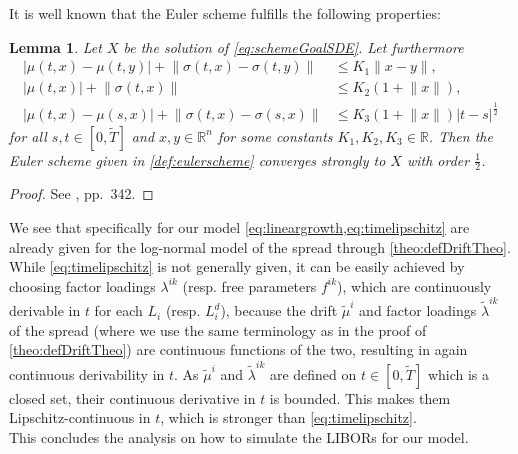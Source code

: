 \documentclass[12pt]{article}
\newtheorem{lemma}[theorem]{Lemma}
\newtheorem{remark}[theorem]{Remark}
\begin{document}
	It is well known that the Euler scheme fulfills the  following properties:
	\begin{lemma}
		Let $X$ be the solution of \cref{eq:schemeGoalSDE}. 
		Let furthermore 
		\begin{align}
			|\mu(t,x) - \mu(t,y)| + \lVert\sigma(t,x) - \sigma(t,y)\rVert &\le K_1 \lVert x - y\rVert, \label{eq:lipschitzcont}\\
			|\mu(t,x)| + \lVert\sigma(t,x)\rVert &\le K_2(1+\lVert x\rVert),\label{eq:lineargrowth}\\
			|\mu(t,x) - \mu(s,x)| + \lVert\sigma(t,x) - \sigma(s,x)\rVert &\le K_3 (1+\lVert x\rVert) |t - s|^{\frac{1}{2}}\label{eq:timelipschitz}
		\end{align}
		for all $s,t \in \left[0,\tilde{T}\right]$ and $x,y\in \mathbb{R}^n$ for some constants $K_1, K_2, K_3 \in \mathbb{R}$.
		Then the Euler scheme given in \cref{def:eulerscheme} converges strongly to $X$ with order $\frac{1}{2}$.
	\end{lemma}
	\begin{proof}
		See \cite{kloedenSchemes}, pp.\ 342.
	\end{proof}
	We see that specifically for our model \cref{eq:lineargrowth,eq:timelipschitz} are already given for the log-normal model of the spread through \cref{theo:defDriftTheo}.\\
	While \cref{eq:timelipschitz} is not generally given, it can be easily achieved by choosing factor loadings $\lambda^{i k}$ (resp. free parameters $f^{i k}$), which are continuously derivable in $t$ for each $L_i$ (resp. $L^d_i$), because the drift $\tilde{\mu}^i$ and factor loadings $\tilde{\lambda}^{i k}$ of the spread (where we use the same terminology as in the proof of \cref{theo:defDriftTheo}) are continuous functions of the two, resulting in again continuous derivability in $t$. As $\tilde{\mu}^i$ and $\tilde{\lambda}^{i k}$ are defined on $t\in\left[0,\tilde{T}\right]$  which is a closed set, their continuous derivative in $t$ is bounded. This makes them Lipschitz-continuous in $t$, which is stronger than \cref{eq:timelipschitz}.\\%
	This concludes the analysis on how to simulate the LIBORs for our model.
	
\end{document}
